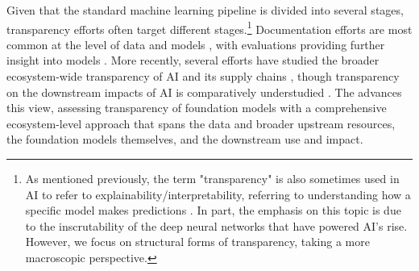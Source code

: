 Given that the standard machine learning pipeline is divided into several stages, transparency efforts often target different stages.\footnote{As mentioned previously, the term "transparency" is also sometimes used in AI to refer to explainability/interpretability, referring to understanding how a specific model makes predictions \citep{zou2023representation}.
In part, the emphasis on this topic is due to the inscrutability of the deep neural networks that have powered AI's rise.
However, we focus on structural forms of transparency, taking a more macroscopic perspective.}
Documentation efforts are most common at the level of data \citep{gebru2021datasheets, bender2018data, pushkarna2022data} and models \citep{mitchell2018modelcards, crisan2022interactive}, with evaluations providing further insight into models \citep{deng2009imagenet, ribeiro2020beyond, perez2022red, liang2022helm, bommasani2023transparency}.
More recently, several efforts have studied the broader ecosystem-wide transparency of AI and its supply chains \citep{bommasani2023ecosystem, cen2023supplychain}, though transparency on the downstream impacts of AI is comparatively understudied \citep{narayanan2023transparencyreports}.
The \projectname advances this view, assessing transparency of foundation models with a comprehensive ecosystem-level approach that spans the data and broader upstream resources, the foundation models themselves, and the downstream use and impact.


